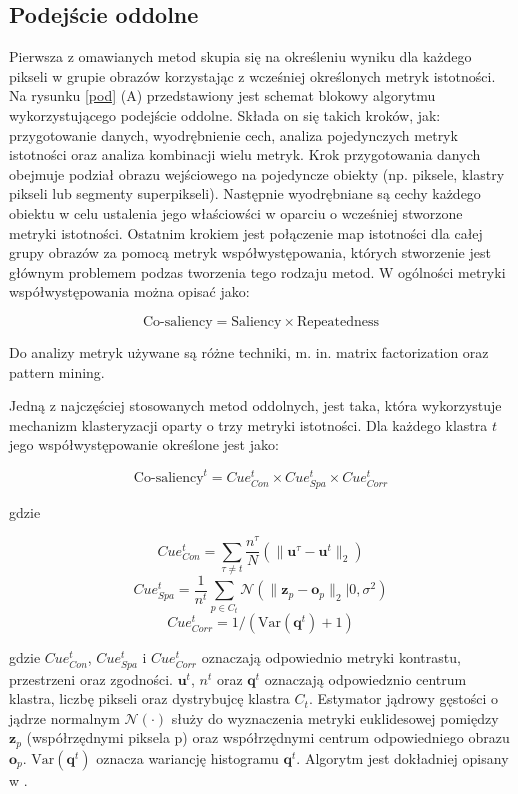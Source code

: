 \documentclass[a4paper,11pt, notitlepage, twosides, openany ]{report}
\begin{document}
	\subsection{Podejście oddolne}
	Pierwsza z omawianych metod skupia się na określeniu wyniku dla każdego pikseli w grupie obrazów korzystając z wcześniej określonych metryk istotności. Na rysunku \ref{pod} (A) przedstawiony jest schemat blokowy algorytmu wykorzystującego podejście oddolne. Składa on się takich kroków, jak: przygotowanie danych, wyodrębnienie cech, analiza pojedynczych metryk istotności oraz analiza kombinacji wielu metryk. Krok przygotowania danych obejmuje podział obrazu wejściowego na pojedyncze obiekty (np. piksele, klastry pikseli lub segmenty superpikseli). Następnie wyodrębniane są cechy każdego obiektu w celu ustalenia jego właściowści w oparciu o wcześniej stworzone metryki istotności. Ostatnim krokiem jest połączenie map istotności dla całej grupy obrazów za pomocą metryk współwystępowania, których stworzenie jest głównym problemem podzas tworzenia tego rodzaju metod. W ogólności metryki współwystępowania można opisać jako:

	$$
		\text{Co-saliency} = \text{Saliency} \times \text{Repeatedness}
	$$



	Do analizy metryk używane są różne techniki, m. in. matrix factorization oraz pattern mining. 

	Jedną z najczęściej stosowanych metod oddolnych, jest taka, która wykorzystuje mechanizm klasteryzacji oparty o trzy metryki istotności. Dla każdego klastra $t$ jego współwystępowanie określone jest jako:

	$$
		\text{Co-saliency}^t = Cue^t_{Con} \times Cue^t_{Spa} \times Cue^t_{Corr}
	$$

	gdzie

	$$
		Cue^t_{Con} = \sum_{\tau \neq t} \frac{n^\tau}{N}\left(\|\mathbf{u}^\tau - \mathbf{u}^t\|_2\right)
	$$
	$$
		Cue^t_{Spa} = \frac{1}{n^t}\sum_{p \in C_t} \mathcal{N}\left(\|\mathbf{z}_p - \mathbf{o}_p\|_2|0,\sigma^2\right)
	$$
	$$
		Cue^t_{Corr} = 1/\left(\text{Var}\left(\mathbf{q}^t\right)+1\right)
	$$

	gdzie $Cue^t_{Con}$, $Cue^t_{Spa}$ i $Cue^t_{Corr}$ oznaczają odpowiednio metryki kontrastu, przestrzeni oraz zgodności. $\mathbf{u}^t$, $n^t$ oraz $\mathbf{q}^t$ oznaczają odpowiedznio centrum klastra, liczbę pikseli oraz dystrybujcę klastra $C_t$. Estymator jądrowy gęstości o jądrze normalnym $\mathcal{N}(\cdot)$ służy do wyznaczenia metryki euklidesowej pomiędzy $\mathbf{z}_p$ (współrzędnymi piksela p) oraz współrzędnymi centrum odpowiedniego obrazu $\mathbf{o}_p$. $\text{Var}\left(\mathbf{q}^t\right)$ oznacza wariancję histogramu $\mathbf{q}^t$. Algorytm jest dokładniej opisany w \cite{bott}.
\end{document}
